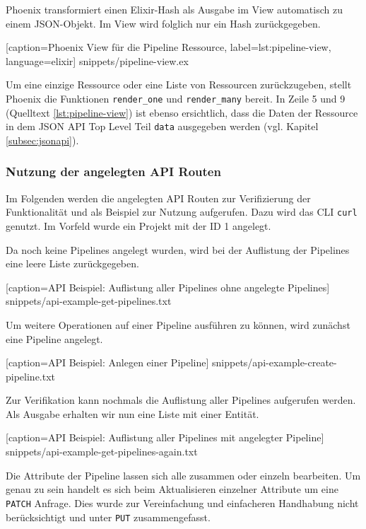 Phoenix transformiert einen Elixir-Hash als Ausgabe im View automatisch zu einem JSON-Objekt. Im View wird folglich nur ein Hash zurückgegeben.


  [caption={Phoenix View für die Pipeline Ressource},
  label={lst:pipeline-view},
  language=elixir]
  {snippets/pipeline-view.ex}

Um eine einzige Ressource oder eine Liste von Ressourcen zurückzugeben, stellt Phoenix die Funktionen \texttt{render\_one} und \texttt{render\_many} bereit. In Zeile 5 und 9 (Quelltext \ref{lst:pipeline-view}) ist ebenso ersichtlich, dass die Daten der Ressource in dem JSON API Top Level Teil \texttt{data} ausgegeben werden (vgl. Kapitel \ref{subsec:jsonapi}).

\subsubsection{Nutzung der angelegten API Routen}

Im Folgenden werden die angelegten API Routen zur Verifizierung der Funktionalität und als Beispiel zur Nutzung aufgerufen. Dazu wird das \ac{CLI} \texttt{curl} genutzt. Im Vorfeld wurde ein Projekt mit der ID 1 angelegt.

Da noch keine Pipelines angelegt wurden, wird bei der Auflistung der Pipelines eine leere Liste zurückgegeben.


  [caption={API Beispiel: Auflistung aller Pipelines ohne angelegte Pipelines}]
  {snippets/api-example-get-pipelines.txt}

Um weitere Operationen auf einer Pipeline ausführen zu können, wird zunächst eine Pipeline angelegt.


  [caption={API Beispiel: Anlegen einer Pipeline}]
  {snippets/api-example-create-pipeline.txt}

Zur Verifikation kann nochmals die Auflistung aller Pipelines aufgerufen werden. Als Ausgabe erhalten wir nun eine Liste mit einer Entität.


  [caption={API Beispiel: Auflistung aller Pipelines mit angelegter Pipeline}]
  {snippets/api-example-get-pipelines-again.txt}

Die Attribute der Pipeline lassen sich alle zusammen oder einzeln bearbeiten. Um genau zu sein handelt es sich beim Aktualisieren einzelner Attribute um eine \texttt{PATCH} Anfrage. Dies wurde zur Vereinfachung und einfacheren Handhabung nicht berücksichtigt und unter \texttt{PUT} zusammengefasst.

